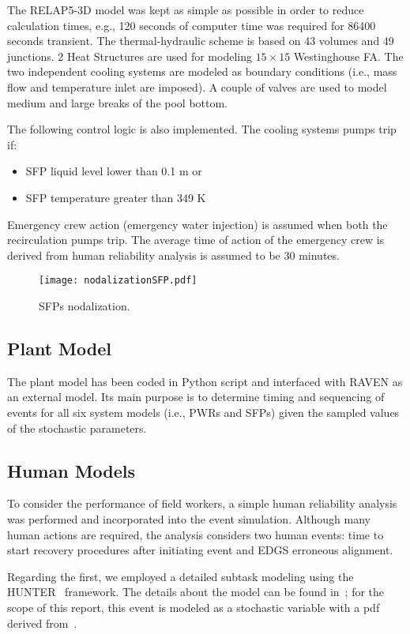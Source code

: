 The RELAP5-3D model was kept as simple as possible in order to reduce calculation times, e.g., 120 seconds 
of computer time was required for 86400 seconds transient. The thermal-hydraulic scheme is based on
43 volumes and 49 junctions. 2 Heat Structures are used for modeling $15 \times 15$ Westinghouse FA. 
The two independent cooling systems are modeled as boundary conditions (i.e., mass flow and 
temperature inlet are imposed). A couple of valves are used to model medium and large breaks of the pool bottom.

The following control logic is also implemented. The cooling systems pumps trip if: 
\begin{itemize}
  \item SFP liquid level lower than 0.1 m or
  \item SFP temperature greater than 349 K
\end{itemize}

Emergency crew action (emergency water injection) is assumed when both the recirculation pumps trip. 
The average time of action of the emergency crew is derived from human reliability analysis is assumed 
to be 30 minutes.

\begin{figure}
    \centering
    \texttt{[image: nodalizationSFP.pdf]}
    \caption{SFPs nodalization.}
    \label{fig:SFPnodalization}
\end{figure}

\subsection{Plant Model}
\label{sec:plantModel}
The plant model has been coded in Python script and interfaced with RAVEN as an 
external model. Its main purpose is to determine timing and sequencing of events 
for all six system models (i.e., PWRs and SFPs) given the sampled values of the 
stochastic parameters.

\subsection{Human Models}
To consider the performance of field workers, a simple human reliability analysis was 
performed and incorporated into the event simulation. Although many human actions are 
required, the analysis considers two human events: time to start recovery procedures 
after initiating event and EDGS erroneous alignment.

Regarding the first, we employed a detailed subtask modeling using the HUNTER~\cite{boringHUNTER} 
framework. The details about 
the model can be found in~\cite{hunterReport2016}; for the scope of this report, this event 
is modeled as a stochastic variable with a pdf derived from~\cite{hunterReport2016}. 

